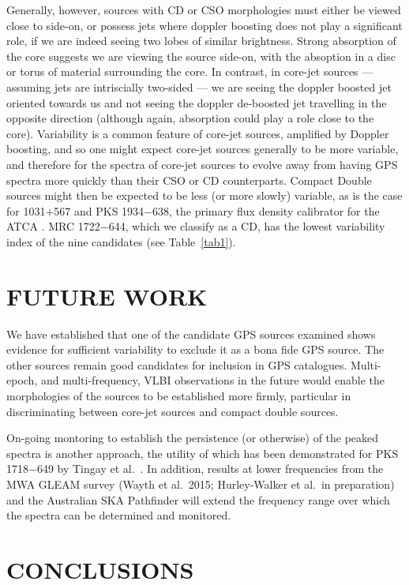 \documentclass{pasa}%
\begin{document}
Generally, however, sources with CD or CSO morphologies must either be
viewed close to side-on, or possess jets where doppler boosting does
not play a significant role, if we are indeed seeing two lobes of
similar brightness.  Strong absorption of the core suggests we are
viewing the source side-on, with the absoption in a disc or torus of
material surrounding the core.  In contrast, in core-jet sources ---
assuming jets are intriscially two-sided --- we are seeing the doppler
boosted jet oriented towards us and not seeing the doppler de-boosted
jet travelling in the opposite direction (although again, absorption
could play a role close to the core).  Variability is a common feature
of core-jet sources, amplified by Doppler boosting, and so one might
expect core-jet sources generally to be more variable, and therefore
for the spectra of core-jet sources to evolve away from having GPS
spectra more quickly than their CSO or CD counterparts.  Compact
Double sources might then be expected to be less (or more slowly)
variable, as is the case for 1031+567 \cite{fas01} and PKS 1934$-$638,
the primary flux density calibrator for the ATCA \cite{par16}. MRC
1722$-$644, which we classify as a CD, has the lowest variability
index of the nine candidates (see Table~\ref{tab1}).


\section{FUTURE WORK}

We have established that one of the candidate GPS sources examined
shows evidence for sufficient variability to exclude it as a bona fide
GPS source.  The other sources remain good candidates for inclusion in
GPS catalogues.  Multi-epoch, and multi-frequency, VLBI observations
in the future would enable the morphologies of the sources to
be established more firmly, particular in discriminating between
core-jet sources and compact double sources.

On-going montoring to establish the persistence (or otherwise) of the
peaked spectra is another approach, the utility of which has been
demonstrated for PKS 1718$-$649 by Tingay et al.\ .
In addition, results at lower frequencies from the MWA GLEAM survey
(Wayth et al.\ 2015; Hurley-Walker et al.\ in preparation) and the
Australian SKA Pathfinder \cite{jon07} will extend the frequency range
over which the spectra can be determined and monitored.


\section{CONCLUSIONS}
\end{document}
